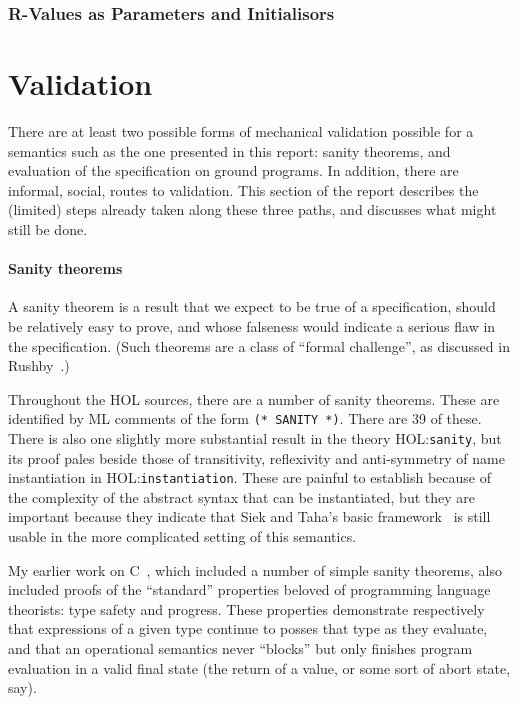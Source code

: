\documentclass[11pt]{article}
\newcommand{\HOLfile}[1]{HOL:\texttt{#1}}
\begin{document}
\subsubsection{R-Values as Parameters and Initialisors}
\label{sec:rvalues-as-parameters}



\section{Validation}
\label{sec:validation}

There are at least two possible forms of mechanical validation
possible for a semantics such as the one presented in this report:
sanity theorems, and evaluation of the specification on ground
programs.  In addition, there are informal, social, routes to
validation.  This section of the report describes the (limited) steps
already taken along these three paths, and discusses what might still
be done.

\paragraph{Sanity theorems}
 A sanity theorem is a result that we expect to
be true of a specification, should be relatively easy to prove, and
whose falseness would indicate a serious flaw in the specification.
(Such theorems are a class of ``formal challenge'', as discussed in
Rushby~\cite{Rushby93}.)

Throughout the HOL sources, there are a number of sanity theorems.
These are identified by ML comments of the form \texttt{(*~SANITY~*)}.
There are 39 of these.  There is also one slightly more substantial
result in the theory \HOLfile{sanity}, but its proof pales beside
those of transitivity, reflexivity and anti-symmetry of name
instantiation in \HOLfile{instantiation}.  These are painful to
establish because of the complexity of the abstract syntax that can be
instantiated, but they are important because they indicate that Siek
and Taha's basic framework~\cite{DBLP:conf/ecoop/SiekT06} is still
usable in the more complicated setting of this \cpp{} semantics.

My earlier work on C~\cite{Norrish98}, which included a number of
simple sanity theorems, also included proofs of the ``standard''
properties beloved of programming language theorists: type safety and
progress.  These properties demonstrate respectively that expressions
of a given type continue to posses that type as they evaluate, and
that an operational semantics never ``blocks'' but only finishes
program evaluation in a valid final state (the return of a value, or
some sort of abort state, say).
\end{document}
